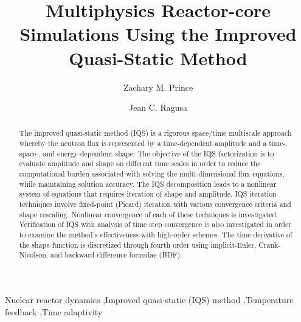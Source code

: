 \documentclass{elsarticle}
\begin{document}
\begin{frontmatter}


\title{Multiphysics Reactor-core Simulations Using the Improved Quasi-Static Method}


\author[tamu]{Zachary M. Prince}

\author[tamu]{Jean C. Ragusa}

\address[tamu]{Texas A\&M University,
  Department of Nuclear Engineering,
  College Station, TX 77840, USA}

\begin{abstract}
The improved quasi-static method (IQS) is a rigorous space/time multiscale approach whereby the neutron flux is represented by a time-dependent amplitude and a time-, space-, and energy-dependent shape. The objective of the IQS factorization is to evaluate amplitude and shape on different time scales in order to reduce the computational burden associated with solving the multi-dimensional flux equations, while maintaining solution accuracy. The IQS decomposition leads to a nonlinear system of equations that requires iteration of shape and amplitude. IQS iteration techniques involve fixed-point (Picard) iteration with various convergence criteria and shape rescaling. Nonlinear convergence of each of these techniques is investigated. Verification of IQS with analysis of time step convergence is also investigated in order to examine the method's effectiveness with high-order schemes. The time derivative of the shape function is discretized through fourth order using implicit-Euler, Crank-Nicolson, and backward difference formulae (BDF).
\end{abstract}

\begin{keyword}
Nuclear reactor dynamics \sep Improved quasi-static (IQS) method \sep Temperature feedback \sep Time adaptivity 
\end{keyword}

\end{frontmatter}


\end{document}
